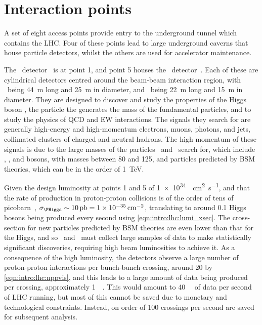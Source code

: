 \section{Interaction points}
\label{chap:intro:lhc:ips}

A set of eight access points provide entry to the underground tunnel which 
contains the \ac{LHC}.
Four of these points lead to large underground caverns that house particle 
detectors, whilst the others are used for accelerator maintenance.

The \atlas\ detector~\cite{Aad:2008zzm} is at point 1, and point 5 houses the 
\cms\ detector~\cite{Chatrchyan:2008aa}.
Each of these are cylindrical detectors centred around the beam-beam 
interaction region, with \atlas\ being \SI{44}{\metre} long and \SI{25}{\metre} 
in diameter, and \cms\ being \SI{22}{\metre} long and \SI{15}{\metre} in 
diameter.
They are designed to discover and study the properties of the Higgs boson 
\PHiggs, the particle the generates the mass of the fundamental particles, and 
to study the physics of \ac{QCD} and \ac{EW} interactions.
The signals they search for are generally high-energy and high-momentum 
electrons, muons, photons, and jets, collimated clusters of charged and neutral 
hadrons.
The high momentum of these signals is due to the large masses of the particles 
\atlas\ and \cms\ search for, which include \PW, \PZ, and \PHiggs bosons, with 
masses between 80 and \SI{125}{\GeVcc}, and particles predicted by \ac{BSM} 
theories, which can be in the order of \SI{1}{\TeV}.

Given the design luminosity at points 1 and 5 of 
\SI{1e34}{\per\square\centi\metre\per\second}, and that the rate of \PHiggs 
production in proton-proton collisions is of the order of tens of 
picobarn~\cite{Khachatryan:2016vau}, $\xsec_{\PHiggs} \sim \SI{10}{\pico\barn} 
= \SI{1e-35}{\per\square\centi\metre}$, translating to around 0.1 Higgs bosons 
being produced every second using \cref{eqn:intro:lhc:lumi_xsec}.
The cross-section for new particles predicted by \ac{BSM} theories are even 
lower than that for the Higgs, and so \atlas\ and \cms\ must collect large 
samples of data to make statistically significant discoveries, requiring high 
beam luminosities to achieve it.
As a consequence of the high luminosity, the detectors observe a large number 
of proton-proton interactions per bunch-bunch crossing, around 20 by 
\cref{eqn:intro:lhc:nppvis}, and this leads to a large amount of data being 
produced per crossing, approximately \SI{1}{\mega\byte}.
This would amount to \SI{40}{\tera\byte} of data per second of \ac{LHC} 
running, but most of this cannot be saved due to monetary and technological 
constraints.
Instead, on order of 100 crossings per second are saved for subsequent 
analysis.

